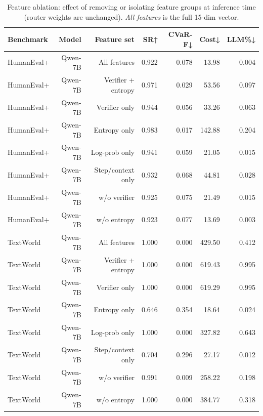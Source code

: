 \begin{table}[t]
\centering
\caption{Feature ablation: effect of removing or isolating feature groups at inference time (router weights are unchanged). \textit{All features} is the full 15-dim vector.}
\label{tab:feature-ablation}
\begin{tabular}{lrrrrrr}
\hline
Benchmark & Model & Feature set & SR↑ & CVaR-F↓ & Cost↓ & LLM\%↓ \\
\hline
HumanEval+ & Qwen-7B & All features & 0.922 & 0.078 & 13.98 & 0.004 \\
HumanEval+ & Qwen-7B & Verifier + entropy & 0.971 & 0.029 & 53.56 & 0.097 \\
HumanEval+ & Qwen-7B & Verifier only & 0.944 & 0.056 & 33.26 & 0.063 \\
HumanEval+ & Qwen-7B & Entropy only & 0.983 & 0.017 & 142.88 & 0.204 \\
HumanEval+ & Qwen-7B & Log-prob only & 0.941 & 0.059 & 21.05 & 0.015 \\
HumanEval+ & Qwen-7B & Step/context only & 0.932 & 0.068 & 44.81 & 0.028 \\
HumanEval+ & Qwen-7B & w/o verifier & 0.925 & 0.075 & 21.49 & 0.015 \\
HumanEval+ & Qwen-7B & w/o entropy & 0.923 & 0.077 & 13.69 & 0.003 \\
TextWorld & Qwen-7B & All features & 1.000 & 0.000 & 429.50 & 0.412 \\
TextWorld & Qwen-7B & Verifier + entropy & 1.000 & 0.000 & 619.43 & 0.995 \\
TextWorld & Qwen-7B & Verifier only & 1.000 & 0.000 & 619.29 & 0.995 \\
TextWorld & Qwen-7B & Entropy only & 0.646 & 0.354 & 18.64 & 0.024 \\
TextWorld & Qwen-7B & Log-prob only & 1.000 & 0.000 & 327.82 & 0.643 \\
TextWorld & Qwen-7B & Step/context only & 0.704 & 0.296 & 27.17 & 0.012 \\
TextWorld & Qwen-7B & w/o verifier & 0.991 & 0.009 & 258.22 & 0.198 \\
TextWorld & Qwen-7B & w/o entropy & 1.000 & 0.000 & 384.77 & 0.318 \\
\hline
\end{tabular}
\end{table}
